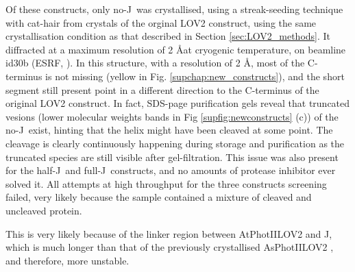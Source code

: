 Of these constructs, only no-J\textalpha\ was crystallised, using a streak-seeding technique with cat-hair \parencite{bergforsSucceedingSeedingPractical2007} from crystals of the orginal LOV2 construct, using the same crystallisation condition as that described in Section \ref{sec:LOV2_methods}. It diffracted at a maximum resolution of 2 \AA at cryogenic temperature, on beamline id30b (ESRF, \cite{mccarthyID30BVersatileBeamline2018}). In this structure, with a resolution of 2 \AA, most of the C-terminus is not missing (yellow in Fig. \ref{supchap:new_constructs}), and the short segment still present point in a different direction to the C-terminus of the original LOV2 construct. In fact, SDS-page purification gels reveal that truncated vesions (lower molecular weights bands in Fig \ref{supfig:newconstructs} (c)) of the no-J\textalpha\ exist, hinting that the helix might have been cleaved at some point. The cleavage is clearly continuously happening during storage and purification as the truncated species are still visible after gel-filtration. This issue was also present for the half-J\textalpha\ and full-J\textalpha\ constructs, and no amounts of protease inhibitor ever solved it. All attempts at high throughput for the three constructs screening failed, very likely because the sample contained a mixture of cleaved and uncleaved protein. 

This is very likely because of the linker region between AtPhotIILOV2 and J\textalpha, which is much longer than that of the previously crystallised AsPhotIILOV2 \parencite{halavatyCTerminalFlankingRegions2007}, and therefore, more unstable. 

